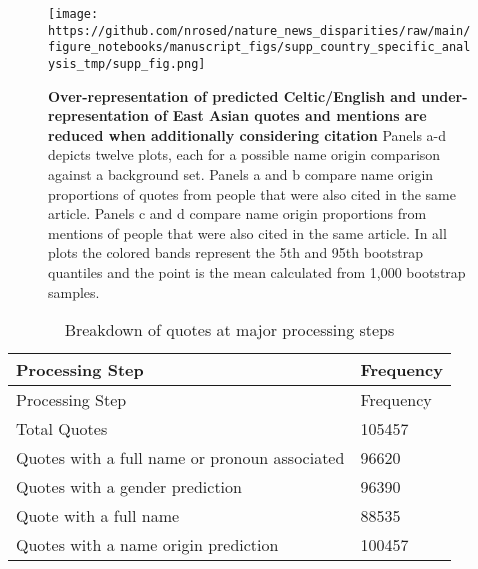 \begin{fignos:tagged-figure}[Supplemental 7]

\begin{figure}
\hypertarget{fig:suppfig_quote_cite}{%
\centering
\texttt{[image: https://github.com/nrosed/nature\_news\_disparities/raw/main/figure\_notebooks/manuscript\_figs/supp\_country\_specific\_analysis\_tmp/supp\_fig.png]}
\caption{\textbf{Over-representation of predicted Celtic/English and under-representation of East Asian quotes and mentions are reduced when additionally considering citation}
Panels a-d depicts twelve plots, each for a possible name origin comparison against a background set.
Panels a and b compare name origin proportions of quotes from people that were also cited in the same article.
Panels c and d compare name origin proportions from mentions of people that were also cited in the same article.
In all plots the colored bands represent the 5th and 95th bootstrap quantiles and the point is the mean calculated from 1,000 bootstrap samples.}\label{fig:suppfig_quote_cite}
}
\end{figure}

\end{fignos:tagged-figure}

\begin{longtable}[]{@{}ll@{}}
\caption{Breakdown of quotes at major processing steps \label{tbl:table1}}\tabularnewline
\toprule
Processing Step & Frequency \\
\midrule
\endfirsthead
\toprule
Processing Step & Frequency \\
\midrule
\endhead
Total Quotes & 105457 \\
Quotes with a full name or pronoun associated & 96620 \\
Quotes with a gender prediction & 96390 \\
Quote with a full name & 88535 \\
Quotes with a name origin prediction & 100457 \\
\bottomrule
\end{longtable}

